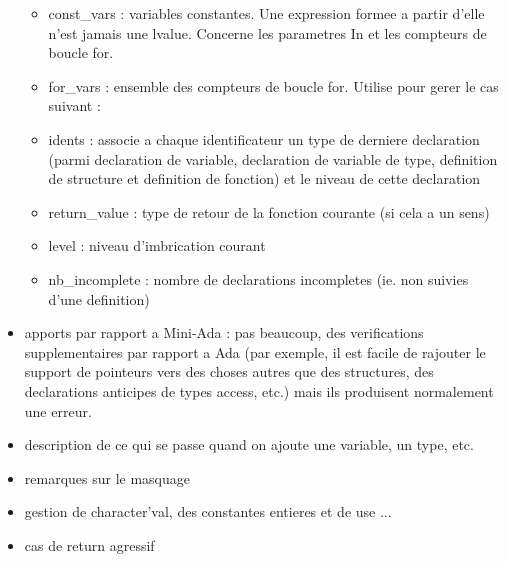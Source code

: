 \documentclass[a4paper,12pt]{article}
\begin{document}
\begin{itemize}
\begin{itemize}
\item const\_vars : variables constantes. Une expression formee a partir d'elle n'est jamais une lvalue. Concerne les parametres In et les compteurs de boucle for.
\item for\_vars : ensemble des compteurs de boucle for. Utilise pour gerer le cas suivant :
\item idents : associe a chaque identificateur un type de derniere declaration (parmi declaration de variable, declaration de variable de type, definition de structure et definition de fonction) et le niveau de cette declaration
\item return\_value : type de retour de la fonction courante (si cela a un sens)
\item level : niveau d'imbrication courant
\item nb\_incomplete : nombre de declarations incompletes (ie. non suivies d'une definition)
\end{itemize}
\item apports par rapport a Mini-Ada : pas beaucoup, des verifications supplementaires par rapport a Ada (par exemple, il est facile de rajouter le support de pointeurs vers des choses autres que des structures, des declarations anticipes de types access, etc.) mais ils produisent normalement une erreur.
\item description de ce qui se passe quand on ajoute une variable, un type, etc.
\item remarques sur le masquage
\item gestion de character'val, des constantes entieres et de use ...
\item cas de return agressif
\end{itemize}
\end{document}
